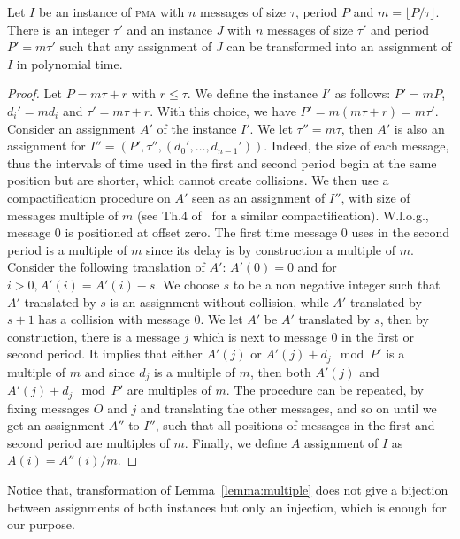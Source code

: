 \documentclass[a4paper,UKenglish,cleveref, autoref, thm-restate]{lipics-v2019}
\newcommand\pma{\textsc{pma}\xspace}
\begin{document}
\begin{lemma}\label{lemma:multiple}
Let $I$ be an instance of \pma with $n$ messages of size $\tau$, period $P$ and $m = \lfloor P / \tau \rfloor$. There is an integer $\tau'$ and an instance $J$ with $n$ messages of size $\tau'$ and period $P'= m\tau'$ such that any assignment of $J$ can be transformed into an assignment of $I$ in polynomial time.
\end{lemma}
\begin{proof}
Let $P = m \tau + r$ with $r \leq \tau$. We define the instance $I'$ as follows: $P' = mP$, $d_{i}' = m d_i$ and $\tau' = m \tau + r$. With this choice, we have $P' = m(m \tau + r) = m \tau'$.
Consider an assignment $A'$ of the instance $I'$. We let $\tau'' = m\tau$, then $A'$ is also an assignment for $I'' = (P',\tau'',(d_{0}',\dots,d_{n-1}'))$. Indeed, the size of each message, thus the intervals of time used in the first and second period begin at the same position but are shorter, which cannot create collisions. We then use a compactification procedure on $A'$ seen as an assignment of $I''$, with size of messages multiple of $m$ (see Th.4 of~\cite{dominique2018deterministic} for a similar compactification). W.l.o.g., message $0$ is positioned at offset zero. The first time message $0$ uses in the second period is a multiple of $m$ since its delay is by construction a multiple of $m$. Consider the following translation of $A'$: $A'(0) = 0$ and for $i>0, A'(i) = A'(i) -s$. We choose $s$ to be a non negative integer such that
$A'$ translated by $s$ is an assignment without collision, while $A'$ translated by $s+1$ has a collision with message $0$. We let $A'$ be $A'$ translated by $s$, then by construction,
 there is a message $j$ which is next to message $0$ in the first or second period. It implies that either $A'(j)$ or $A'(j)+d_j \mod P'$ is a multiple of $m$ and since $d_j$ is a multiple of $m$, then both $A'(j)$ and $A'(j)+d_j \mod P'$ are multiples of $m$. The procedure can be repeated, by fixing messages $O$ and $j$ and translating the other messages, and so on until we get an assignment $A''$ to $I''$, such that all positions of messages in the first and second period are multiples of $m$. Finally, we define $A$ assignment of $I$ as $A(i) = A''(i)/m$. 
\end{proof}

Notice that, transformation of Lemma~\ref{lemma:multiple} does not give a bijection between assignments of both instances but only an injection, which is enough for our purpose. 
\end{document}
